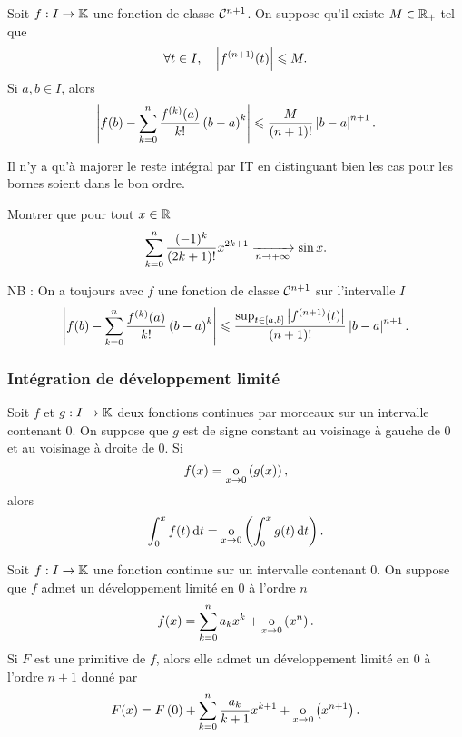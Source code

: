 \documentclass{magnolia}
\begin{document}
\begin{proposition}[utile=3, nom=Inégalité de \nom{Taylor-Lagrange}]
Soit $f:I\to\mathbb{K}$ une fonction de classe $\mathcal{C}^{n+1}$. On
suppose qu'il existe $M\in\mathbb{R}_+$ tel que
\[\forall t\in I ,\quad \left|f^{(n+1)}(t)\right|\leqslant M.\]
Si $a,b\in I$, alors
  \[\left|f(b)-\sum_{k=0}^n \frac{f^{(k)}(a)}{k!}\left(b-a\right)^k\right|\leqslant
  \frac{M}{\left(n+1\right)!}\left|b-a\right|^{n+1}.\]
\end{proposition}

\begin{preuve}
Il n'y a qu'à majorer le reste intégral par IT en distinguant bien les cas pour les bornes soient dans le bon ordre.
\end{preuve}


\begin{exoUnique}
\exo Montrer que pour tout $x\in\mathbb{R}$
  \[\sum_{k=0}^n \frac{(-1)^k}{(2k+1)!} x^{2k+1}\xrightarrow[n\rightarrow +\infty]{} \sin x.\]
\end{exoUnique}

\begin{sol}
NB : On a toujours avec $f$ une fonction de classe $\mathcal{C}^{n+1}$ sur l'intervalle $I$ $$\left|f(b)-\sum_{k=0}^n \frac{f^{(k)}(a)}{k!}\left(b-a\right)^k\right|\leqslant
  \frac{\sup_{t\in\left[a,b\right]}\left|f^{(n+1)}(t)\right|}{\left(n+1\right)!}\left|b-a\right|^{n+1}.$$
\end{sol}
\subsubsection{Intégration de développement limité}
\begin{proposition}[utile=1]
Soit $f$ et $g:I\to\mathbb{K}$ deux fonctions continues par morceaux sur un intervalle
contenant $0$. On suppose que $g$ est de signe constant au voisinage à gauche
de $0$ et au voisinage à droite de $0$. Si
\[f(x)=\underset{x \rightarrow 0}{\text{o}}\left(g(x)\right),\]
alors
\[\int_{0}^{x} f(t)\,\text{d}t=\underset{x \rightarrow 0}{\text{o}}\left(\int_{0}^{x} g(t)\,\text{d}t\right).\]
\end{proposition}

\begin{proposition}[utile=3]
Soit $f:I\to\mathbb{K}$ une fonction continue sur un intervalle contenant $0$. On
suppose que $f$ admet un développement limité en $0$ à l'ordre $n$
\[f(x)=\sum_{k=0}^n a_k x^k+\underset{x \rightarrow 0}{\text{o}}\left(x^n\right).\]
Si $F$ est une primitive de $f$, alors elle admet un développement limité en 0 à
l'ordre $n+1$ donné par
\[F(x)=F\left(0\right)+\sum_{k=0}^n \frac{a_k}{k+1} x^{k+1}+
                          \underset{x \rightarrow 0}{\text{o}}\left(x^{n+1}\right).\]
\end{proposition}
\end{document}
